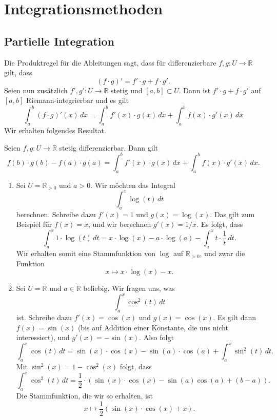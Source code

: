 \documentclass[../main.tex]{subfiles}
\begin{document}
\section{Integrationsmethoden}
\subsection*{Partielle Integration}
Die Produktregel für die Ableitungen sagt, dass für
differenzierbare $f, g \colon U \to \mathbb{R}$ gilt, dass
\[
  (f\cdot g)' = f'\cdot g + f\cdot g'.
\]
Seien nun zusätzlich $f', g' \colon U \to \mathbb{R}$ stetig
und $[a, b] \subset U$. Dann ist $f' \cdot g + f \cdot g'$ 
auf $[a, b]$ Riemann-integrierbar und es gilt
\[
  \int_{a}^{b} (f \cdot g)' (x) \, dx
  = \int_{a}^{b} f'(x) \cdot g(x) \, dx
  + \int_{a}^{b} f(x) \cdot g'(x) \, dx
\]
Wir erhalten folgendes Resultat.

\begin{byparts}
  Seien $f, g \colon U \to \mathbb{R}$ stetig differenzierbar.
  Dann gilt 
  \[
    f(b) \cdot g(b) - f(a) \cdot g(a)
    = \int_{a}^{b} f'(x) \cdot g(x) \, dx
    + \int_{a}^{b} f(x) \cdot g'(x) \, dx.
  \]
\end{byparts}

\begin{examples}
  \leavevmode
  \begin{enumerate}[(1)]
    \item Sei $U = \mathbb{R}_{>0}$ und $a  > 0$.
      Wir möchten das Integral
      \[
        \int_{a}^{x} \log(t) \, dt
      \]
      berechnen. Schreibe dazu
      $f'(x) = 1$ und $g(x) = \log (x)$.
      Das gilt zum Beispiel für $f(x) = x$,
      und wir berechnen $g'(x) = 1/x$.
      Es folgt, dass
      \[
        \int_{a}^{x} 1 \cdot \log(t) \, dt
        = x \cdot \log (x) - a \cdot \log (a)
        - \int_{a}^{x} t \cdot \frac{1}{t} \, dt.
      \]
      Wir erhalten somit eine Stammfunktion von $\log$ 
      auf $\mathbb{R}_{>0}$, und zwar die Funktion
      \[
        x \mapsto x \cdot \log(x) - x.
      \]
    \item Sei $U = \mathbb{R}$ und $a \in \mathbb{R}$ beliebig.
      Wir fragen uns, was
      \[
        \int_{a}^{x} \cos^2(t) \, dt
      \]
      ist. Schreibe dazu $f'(x) = \cos (x)$ 
      und $g(x) = \cos(x)$.
      Es gilt dann
      $f(x) = \sin(x)$ (bis auf Addition einer Konstante,
      die uns nicht interessiert), und $g'(x) = -\sin(x)$.
      Also folgt
      \[
        \int_{a}^{x} \cos(t) \, dt
        = \sin(x) \cdot \cos (x) -
        \sin(a) \cdot \cos (a) +
        \int_{a}^{x} \sin^2(t) \, dt.
      \]
      Mit $\sin^2(x) = 1 - \cos^2(x)$ folgt, dass
      \[
        \int_{a}^{x} \cos^2(t) \, dt
        = \frac{1}{2} \cdot
        \left( \sin(x) \cdot \cos(x) -
        \sin(a) \cos (a) + (b-a) \right).
      \]
      Die Stammfunktion, die wir so erhalten, ist
      \[
        x \mapsto \frac{1}{2} (\sin (x) \cdot \cos(x) + x).
      \]
  \end{enumerate}
\end{examples}
\end{document}

